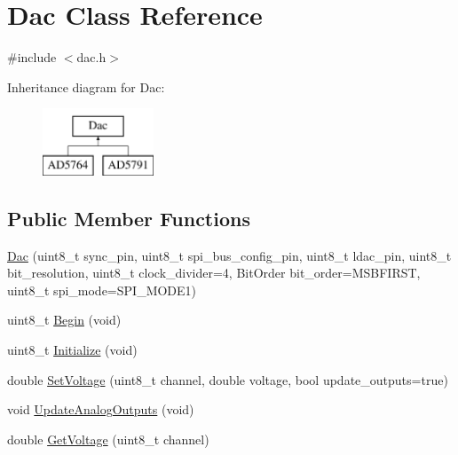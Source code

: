 \hypertarget{classDac}{}\section{Dac Class Reference}
\label{classDac}


{\ttfamily \#include $<$dac.\+h$>$}

Inheritance diagram for Dac\+:\begin{figure}[H]
\begin{center}
\leavevmode
\includegraphics[height=2.000000cm]{classDac}
\end{center}
\end{figure}
\subsection*{Public Member Functions}
\begin{DoxyCompactItemize}
\item 
\mbox{\hyperlink{classDac_a43b0ea171bf0dfad95427e9751b6e191}{Dac}} (uint8\+\_\+t sync\+\_\+pin, uint8\+\_\+t spi\+\_\+bus\+\_\+config\+\_\+pin, uint8\+\_\+t ldac\+\_\+pin, uint8\+\_\+t bit\+\_\+resolution, uint8\+\_\+t clock\+\_\+divider=4, Bit\+Order bit\+\_\+order=M\+S\+B\+F\+I\+R\+ST, uint8\+\_\+t spi\+\_\+mode=S\+P\+I\+\_\+\+M\+O\+D\+E1)
\item 
uint8\+\_\+t \mbox{\hyperlink{classDac_a342bb811b205d50baacb3211e89ea062}{Begin}} (void)
\item 
uint8\+\_\+t \mbox{\hyperlink{classDac_aea1f5f36c9371ebc1527e848ce67e47a}{Initialize}} (void)
\item 
double \mbox{\hyperlink{classDac_ab2f0e36184b9b529de04136c36a3a51b}{Set\+Voltage}} (uint8\+\_\+t channel, double voltage, bool update\+\_\+outputs=true)
\item 
void \mbox{\hyperlink{classDac_aafef1707ec33a2166a69e9b646cd471b}{Update\+Analog\+Outputs}} (void)
\item 
double \mbox{\hyperlink{classDac_ad51bf5450f03f39a0357398af69f1705}{Get\+Voltage}} (uint8\+\_\+t channel)
\end{DoxyCompactItemize}
